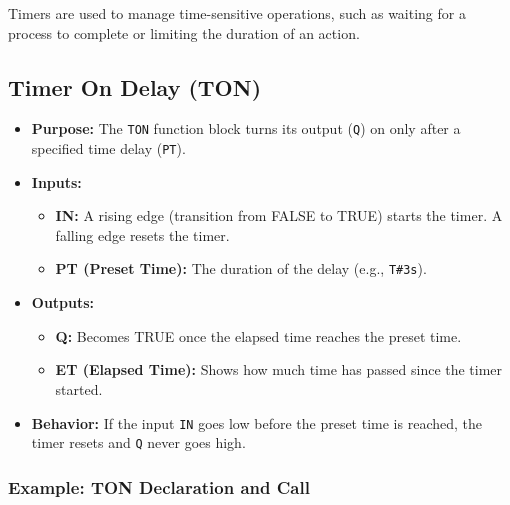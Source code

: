 \documentclass[11pt,a4paper]{article}
\begin{document}
Timers are used to manage time-sensitive operations, such as waiting for a process to complete or limiting the duration of an action.

\subsection{Timer On Delay (TON)}

\begin{itemize}[leftmargin=*]
    \item \textbf{Purpose:} The \texttt{TON} function block turns its output (\texttt{Q}) on only after a specified time delay (\texttt{PT}).
    
    \item \textbf{Inputs:}
    \begin{itemize}
        \item \textbf{IN:} A rising edge (transition from FALSE to TRUE) starts the timer. A falling edge resets the timer.
        \item \textbf{PT (Preset Time):} The duration of the delay (e.g., \texttt{T\#3s}).
    \end{itemize}
    
    \item \textbf{Outputs:}
    \begin{itemize}
        \item \textbf{Q:} Becomes TRUE once the elapsed time reaches the preset time.
        \item \textbf{ET (Elapsed Time):} Shows how much time has passed since the timer started.
    \end{itemize}
    
    \item \textbf{Behavior:} If the input \texttt{IN} goes low before the preset time is reached, the timer resets and \texttt{Q} never goes high.
\end{itemize}

\subsubsection*{Example: TON Declaration and Call}
\end{document}
